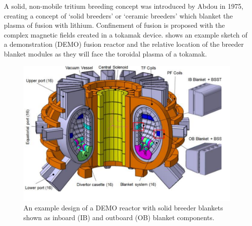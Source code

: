 A solid, non-mobile tritium breeding concept was introduced by Abdou\etal\cite{Abdou1975} in 1975, creating a concept of `solid breeders' or `ceramic breeders' which blanket the plasma of fusion with lithium. Confinement of fusion is proposed with the complex magnetic fields created in a tokamak device.  shows an example sketch of a demonstration (DEMO) fusion reactor and the relative location of the breeder blanket modules as they will face the toroidal plasma of a tokamak.

\begin{figure}[ht]
	\centering
	\includegraphics[width=\singleimagewidth]{figures/demo} 
	\caption{An example design of a DEMO reactor with solid breeder blankets shown as inboard (IB) and outboard (OB) blanket components.}
	\label{fig:demo}
\end{figure}

